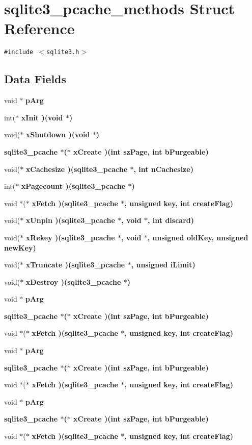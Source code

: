 \section{sqlite3\_\-pcache\_\-methods Struct Reference}
\label{structsqlite3__pcache__methods}
{\tt \#include $<$sqlite3.h$>$}

\subsection*{Data Fields}
\begin{CompactItemize}
\item 
void $\ast$ \bf{p\-Arg}
\item 
int($\ast$ \bf{x\-Init} )(void $\ast$)
\item 
void($\ast$ \bf{x\-Shutdown} )(void $\ast$)
\item 
\bf{sqlite3\_\-pcache} $\ast$($\ast$ \bf{x\-Create} )(int sz\-Page, int b\-Purgeable)
\item 
void($\ast$ \bf{x\-Cachesize} )(\bf{sqlite3\_\-pcache} $\ast$, int n\-Cachesize)
\item 
int($\ast$ \bf{x\-Pagecount} )(\bf{sqlite3\_\-pcache} $\ast$)
\item 
void $\ast$($\ast$ \bf{x\-Fetch} )(\bf{sqlite3\_\-pcache} $\ast$, unsigned key, int create\-Flag)
\item 
void($\ast$ \bf{x\-Unpin} )(\bf{sqlite3\_\-pcache} $\ast$, void $\ast$, int discard)
\item 
void($\ast$ \bf{x\-Rekey} )(\bf{sqlite3\_\-pcache} $\ast$, void $\ast$, unsigned old\-Key, unsigned new\-Key)
\item 
void($\ast$ \bf{x\-Truncate} )(\bf{sqlite3\_\-pcache} $\ast$, unsigned i\-Limit)
\item 
void($\ast$ \bf{x\-Destroy} )(\bf{sqlite3\_\-pcache} $\ast$)
\item 
void $\ast$ \bf{p\-Arg}
\item 
\bf{sqlite3\_\-pcache} $\ast$($\ast$ \bf{x\-Create} )(int sz\-Page, int b\-Purgeable)
\item 
void $\ast$($\ast$ \bf{x\-Fetch} )(\bf{sqlite3\_\-pcache} $\ast$, unsigned key, int create\-Flag)
\item 
void $\ast$ \bf{p\-Arg}
\item 
\bf{sqlite3\_\-pcache} $\ast$($\ast$ \bf{x\-Create} )(int sz\-Page, int b\-Purgeable)
\item 
void $\ast$($\ast$ \bf{x\-Fetch} )(\bf{sqlite3\_\-pcache} $\ast$, unsigned key, int create\-Flag)
\item 
void $\ast$ \bf{p\-Arg}
\item 
\bf{sqlite3\_\-pcache} $\ast$($\ast$ \bf{x\-Create} )(int sz\-Page, int b\-Purgeable)
\item 
void $\ast$($\ast$ \bf{x\-Fetch} )(\bf{sqlite3\_\-pcache} $\ast$, unsigned key, int create\-Flag)
\end{CompactItemize}


